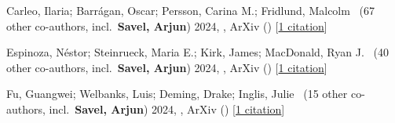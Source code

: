 \item[{\color{numcolor}\scriptsize3}] Carleo, Ilaria; Barr{\'a}gan, Oscar; Persson, Carina M.; Fridlund, Malcolm \etal\ ({67} other co-authors, incl.\ \textbf{Savel, Arjun}) 2024, , ArXiv () [\href{https://ui.adsabs.harvard.edu/abs/2024arXiv240805612C}{1 citation}]

\item[{\color{numcolor}\scriptsize2}] Espinoza, N{\'e}stor; Steinrueck, Maria E.; Kirk, James; MacDonald, Ryan J. \etal\ ({40} other co-authors, incl.\ \textbf{Savel, Arjun}) 2024, , ArXiv () [\href{https://ui.adsabs.harvard.edu/abs/2024arXiv240710294E}{1 citation}]

\item[{\color{numcolor}\scriptsize1}] Fu, Guangwei; Welbanks, Luis; Deming, Drake; Inglis, Julie \etal\ ({15} other co-authors, incl.\ \textbf{Savel, Arjun}) 2024, , ArXiv () [\href{https://ui.adsabs.harvard.edu/abs/2024arXiv240706163F}{1 citation}]